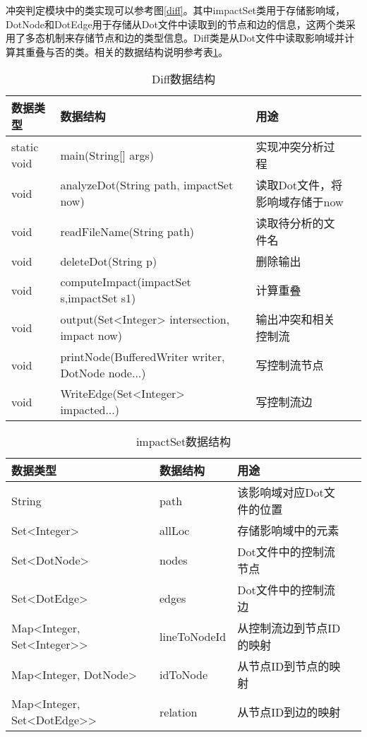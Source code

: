 冲突判定模块中的类实现可以参考图\ref {diff}。其中impactSet类用于存储影响域，DotNode和DotEdge用于存储从Dot文件中读取到的节点和边的信息，这两个类采用了多态机制来存储节点和边的类型信息。Diff类是从Dot文件中读取影响域并计算其重叠与否的类。相关的数据结构说明参考表\ref {diff_data}。

\begin{table}[H]
	\caption{Diff数据结构}
	\label{diff_data}
	\centering
	\begin{tabular}{lllc}
		\toprule[1.5pt]
		{\heiti 数据类型} &{\heiti 数据结构} & {\heiti 用途} \\\midrule[1pt]
		static void & main(String[] args) & 实现冲突分析过程\\
		void & analyzeDot(String path, impactSet now) & 读取Dot文件，将影响域存储于now \\
		void & readFileName(String path) & 读取待分析的文件名\\
		void & deleteDot(String p) & 删除输出\\
		void & computeImpact(impactSet s,impactSet s1) & 计算重叠\\
		void & output(Set<Integer> intersection, impact now) & 输出冲突和相关控制流\\
		void & printNode(BufferedWriter writer, DotNode node...) & 写控制流节点\\
		void &  WriteEdge(Set<Integer>  impacted...) & 写控制流边\\
		\bottomrule[1.5pt] 
	\end{tabular}
\end{table}

\begin{table}[H]
	\caption{impactSet数据结构}
	\label{impact_data}
	\centering
	\begin{tabular}{lllc}
		\toprule[1.5pt]
		{\heiti 数据类型} &{\heiti 数据结构} & {\heiti 用途} \\\midrule[1pt]
		String     &  path & 该影响域对应Dot文件的位置 \\
		Set<Integer>  &  allLoc & 存储影响域中的元素 \\
		Set<DotNode>  & nodes & Dot文件中的控制流节点\\
		Set<DotEdge>  & edges & Dot文件中的控制流边\\
		Map<Integer, Set<Integer>> & lineToNodeId & 从控制流边到节点ID的映射\\
		Map<Integer, DotNode>  & idToNode & 从节点ID到节点的映射 \\
		Map<Integer, Set<DotEdge>>  &  relation & 从节点ID到边的映射 \\
		\bottomrule[1.5pt] 
	\end{tabular}
\end{table}

